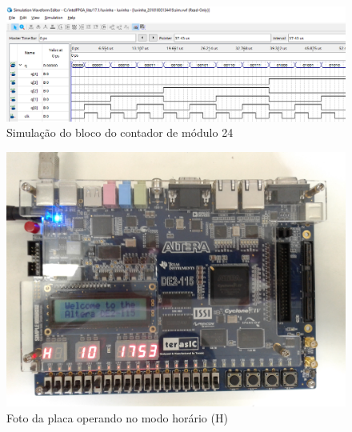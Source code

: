\documentclass[14pt, oneside]{book}
\theoremstyle{definition}
\begin{document}
            
                \begin{figure}[H]
                    \centering
                    \includegraphics[width=\columnwidth]{simulacao_mod_24.png}
                    \caption{Simulação do bloco do contador de módulo 24}
                    \label{simulação_24}
                \end{figure}
                
                \begin{figure}[H]
                    \centering
                    \includegraphics[width=\columnwidth]{foto_placa_H.jpg}
                    \caption{Foto da placa operando no modo horário (H)}
                    \label{foto_H}
                \end{figure}
                
\end{document}
